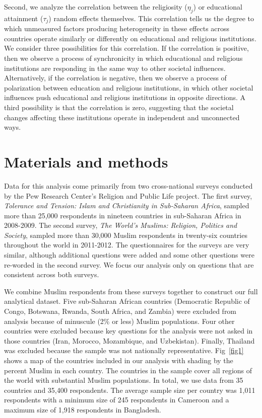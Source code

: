 \documentclass[10pt,letterpaper]{article}
\begin{document}
Second, we analyze the correlation between the religiosity (\(\eta_j\))
or educational attainment (\(\tau_j\)) random effects themselves. This
correlation tells us the degree to which unmeasured factors producing
heterogeneity in these effects across countries operate similarly or
differently on educational and religious institutions. We consider three
possibilities for this correlation. If the correlation is positive, then
we observe a process of synchronicity in which educational and religious
institutions are responding in the same way to other societal
influences. Alternatively, if the correlation is negative, then we
observe a process of polarization between education and religious
institutions, in which other societal influences push educational and
religious institutions in opposite directions. A third possibility is
that the correlation is zero, suggesting that the societal changes
affecting these institutions operate in independent and unconnected
ways.

\section*{Materials and methods}

Data for this analysis come primarily from two cross-national surveys
conducted by the Pew Research Center's Religion and Public Life project.
The first survey, \emph{Tolerance and Tension: Islam and Christianity in
Sub-Saharan Africa}, sampled more than 25,000 respondents in nineteen
countries in sub-Saharan Africa in 2008-2009. The second survey,
\emph{The World's Muslims: Religion, Politics and Society}, sampled more
than 30,000 Muslim respondents in twenty-six countries throughout the
world in 2011-2012. The questionnaires for the surveys are very similar,
although additional questions were added and some other questions were
re-worded in the second survey. We focus our analysis only on questions
that are consistent across both surveys.

We combine Muslim respondents from these surveys together to construct
our full analytical dataset. Five sub-Saharan African countries
(Democratic Republic of Congo, Botswana, Rwanda, South Africa, and
Zambia) were excluded from analysis because of minuscule (2\% or less)
Muslim populations. Four other countries were excluded because key
questions for the analysis were not asked in those countries (Iran,
Morocco, Mozambique, and Uzbekistan). Finally, Thailand was excluded
because the sample was not nationally representative. Fig~\ref{fig1} shows a
map of the countries included in our analysis with shading by the
percent Muslim in each country. The countries in the sample cover all
regions of the world with substantial Muslim populations. In total, we
use data from 35 countries and 35,400 respondents. The average sample
size per country was 1,011 respondents with a minimum size of 245
respondents in Cameroon and a maximum size of 1,918 respondents in
Bangladesh.
\end{document}
